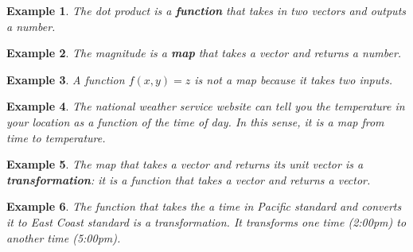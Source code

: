 \documentclass[12pt]{article}
\newtheorem{example}{Example}[section]
\begin{document}
\begin{example}
The dot product is a \textbf{function} that takes in two vectors and outputs a number.
\end{example}
\begin{example}
The magnitude is a \textbf{map} that takes a vector and returns a number.
\end{example}
\begin{example}
A function $f(x,y)=z$ is not a map because it takes two inputs.
\end{example}
\begin{example}
The national weather service website can tell you the temperature in your location as a function of the time of day. In this sense, it is a map from time to temperature.
\end{example}
\begin{example}
The map that takes a vector and returns its unit vector is a \textbf{transformation}: it is a function that takes a vector and returns a vector.
\end{example}
\begin{example}
The function that takes the a time in Pacific standard and converts it to East Coast standard is a transformation. It transforms one time (2:00pm) to another time (5:00pm).
\end{example}
\end{document}
